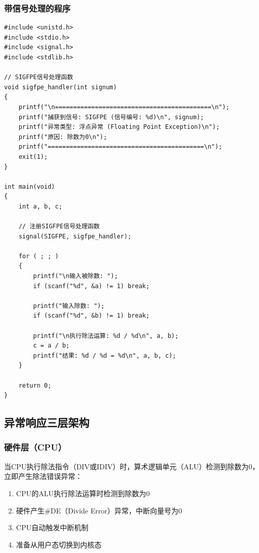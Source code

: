 \documentclass[UTF8,a4paper,12pt]{ctexart}
\begin{document}
\subsubsection{带信号处理的程序}

\begin{lstlisting}[style=cstyle,caption={division\_zero\_with\_handler.c - 带信号处理}]
#include <unistd.h>
#include <stdio.h>
#include <signal.h>
#include <stdlib.h>

// SIGFPE信号处理函数
void sigfpe_handler(int signum)
{
    printf("\n===========================================\n");
    printf("捕获到信号: SIGFPE (信号编号: %d)\n", signum);
    printf("异常类型: 浮点异常 (Floating Point Exception)\n");
    printf("原因: 除数为0\n");
    printf("===========================================\n");
    exit(1);
}

int main(void)
{
    int a, b, c;

    // 注册SIGFPE信号处理函数
    signal(SIGFPE, sigfpe_handler);

    for ( ; ; )
    {
        printf("\n输入被除数: ");
        if (scanf("%d", &a) != 1) break;

        printf("输入除数: ");
        if (scanf("%d", &b) != 1) break;

        printf("\n执行除法运算: %d / %d\n", a, b);
        c = a / b;
        printf("结果: %d / %d = %d\n", a, b, c);
    }

    return 0;
}
\end{lstlisting}

\subsection{异常响应三层架构}

\subsubsection{硬件层（CPU）}

当CPU执行除法指令（DIV或IDIV）时，算术逻辑单元（ALU）检测到除数为0，立即产生除法错误异常：

\begin{enumerate}[leftmargin=2em]
    \item CPU的ALU执行除法运算时检测到除数为0
    \item 硬件产生\#DE（Divide Error）异常，中断向量号为0
    \item CPU自动触发中断机制
    \item 准备从用户态切换到内核态
\end{enumerate}
\end{document}
